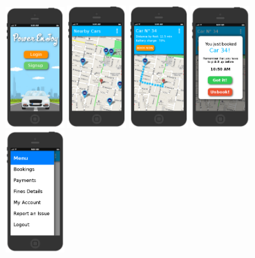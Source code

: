 \documentclass[11pt]{article} %
\begin{document}
\begin{figure}[H]
	\includegraphics[width=0.2\textwidth]{../mockup/1Login.png}
	\includegraphics[width=0.2\textwidth]{../mockup/2MainClient.png}
	\includegraphics[width=0.2\textwidth]{../mockup/3CarSelected.png}
	\includegraphics[width=0.2\textwidth]{../mockup/4CarBooked.png}
	\includegraphics[width=0.2\textwidth]{../mockup/11Menu.png}

\end{figure}
\end{document}
